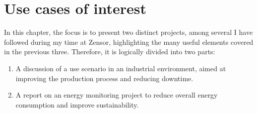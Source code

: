 \chapter{Use cases of interest}
\label{chapter:use_cases}
In this chapter, the focus is to present two distinct projects, among several I have followed during my time at Zensor, highlighting the many useful elements covered in the previous three. %
Therefore, it is logically divided into two parts:
\begin{enumerate}
    \item A discussion of a use scenario in an industrial environment, aimed at improving the production process and reducing downtime.
    \item A report on an energy monitoring project to reduce overall energy consumption and improve sustainability.
\end{enumerate}


\clearpage




